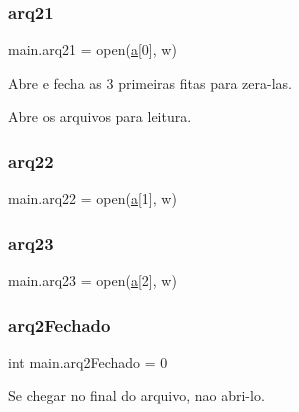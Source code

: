 \mbox{\label{namespacemain_aa218c5e81c47f70fd7ecb1018d22da60}} 
\subsubsection{\texorpdfstring{arq21}{arq21}}
{\footnotesize\ttfamily main.\+arq21 = open(\hyperlink{namespacemain_aa164244f9ef98d3941710f56dae766dc}{a}\mbox{[}0\mbox{]}, \textquotesingle{}w\textquotesingle{})}



Abre e fecha as 3 primeiras fitas para zera-\/las. 

Abre os arquivos para leitura. \mbox{\label{namespacemain_a1ba454b0949959e89f19ead972eefaa3}} 
\subsubsection{\texorpdfstring{arq22}{arq22}}
{\footnotesize\ttfamily main.\+arq22 = open(\hyperlink{namespacemain_aa164244f9ef98d3941710f56dae766dc}{a}\mbox{[}1\mbox{]}, \textquotesingle{}w\textquotesingle{})}

\mbox{\label{namespacemain_adcb0b761002159eece56799f58375371}} 
\subsubsection{\texorpdfstring{arq23}{arq23}}
{\footnotesize\ttfamily main.\+arq23 = open(\hyperlink{namespacemain_aa164244f9ef98d3941710f56dae766dc}{a}\mbox{[}2\mbox{]}, \textquotesingle{}w\textquotesingle{})}

\mbox{\label{namespacemain_a5d2496a58a1981a2952832398b61fdef}} 
\subsubsection{\texorpdfstring{arq2\+Fechado}{arq2Fechado}}
{\footnotesize\ttfamily int main.\+arq2\+Fechado = 0}



Se chegar no final do arquivo, nao abri-\/lo. 

